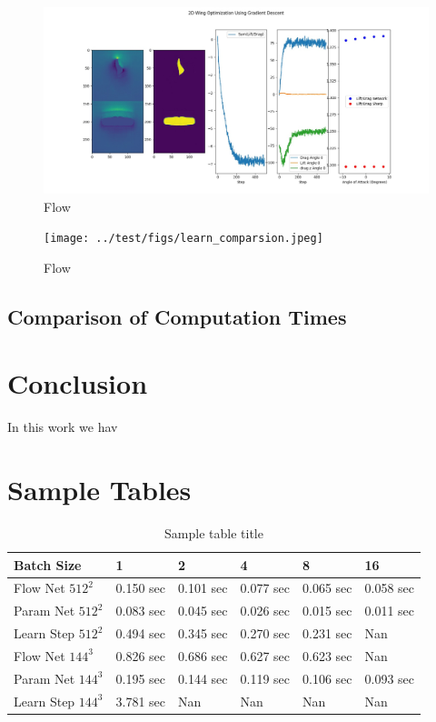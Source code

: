 \documentclass{article} %
\begin{document}
\begin{figure}[h]
\begin{center}
\includegraphics[scale=0.30]{../test/figs/learn_gradient_descent.jpeg}
\end{center}
\caption{Flow}
\end{figure}

\begin{figure}[h]
\begin{center}
\texttt{[image: ../test/figs/learn\_comparsion.jpeg]}
\end{center}
\caption{Flow}
\end{figure}

\subsection{Comparison of Computation Times}



\section{Conclusion}

In this work we hav


\section{Sample Tables}

\begin{table}[t]
\caption{Sample table title}
\label{sample-table}
\begin{center}
\begin{tabular}{l|lllll}
Batch Size & 1 & 2 & 4 & 8 & 16 \\ \hline 
Flow Net $512^2$ & 0.150 sec & 0.101 sec & 0.077 sec & 0.065 sec & 0.058 sec \\ 
Param Net $512^2$ & 0.083 sec & 0.045 sec & 0.026 sec & 0.015 sec & 0.011 sec \\ 
Learn Step $512^2$ & 0.494 sec & 0.345 sec & 0.270 sec & 0.231 sec & Nan \\ 
Flow Net $144^3$ & 0.826 sec & 0.686 sec & 0.627 sec & 0.623 sec & Nan \\ 
Param Net $144^3$ & 0.195 sec & 0.144 sec & 0.119 sec & 0.106 sec & 0.093 sec \\ 
Learn Step $144^3$ & 3.781 sec & Nan & Nan & Nan & Nan \\ 
\end{tabular}
\end{center}
\end{table}
\end{document}
